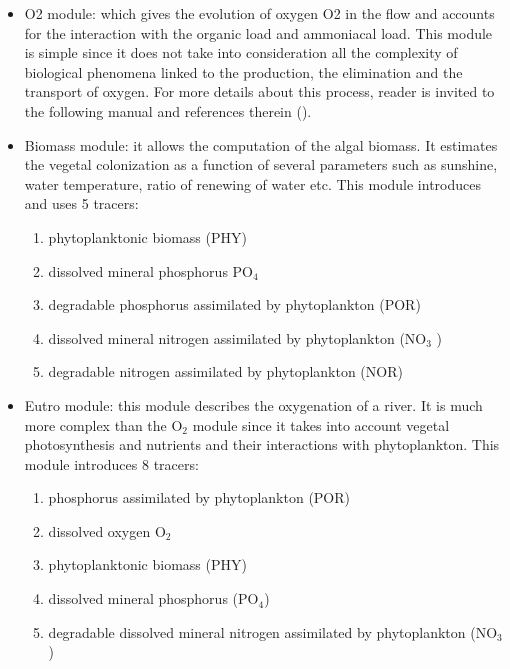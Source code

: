 \begin{itemize}
\item  O2 module:  which gives the evolution of oxygen O2 in the flow and accounts for the interaction with the organic load and ammoniacal load. This module is simple since it does not take into consideration all the complexity of biological phenomena linked to the production, the elimination and the transport of oxygen. For more details about this process, reader is invited to the following manual and references therein (\cite{El-Kadi2012}).

\item  Biomass module:  it allows the computation of the algal biomass. It estimates the vegetal colonization as a function of several parameters such as sunshine, water temperature, ratio of renewing of water etc. This module introduces and uses 5 tracers:

\begin{enumerate}
\item  phytoplanktonic biomass (PHY)

\item  dissolved mineral phosphorus PO${}_{4}$

\item  degradable phosphorus assimilated by phytoplankton (POR)

\item  dissolved mineral nitrogen assimilated by phytoplankton (NO${}_{3}$ )

\item  degradable nitrogen assimilated by phytoplankton (NOR)
\end{enumerate}

\item  Eutro module:  this module describes the oxygenation of a river. It is much more complex than the O${}_{2}$ module since it takes into account vegetal photosynthesis and nutrients and their interactions with phytoplankton. This module introduces 8 tracers:
\begin{enumerate}
\item  phosphorus assimilated by phytoplankton (POR)

\item  dissolved oxygen O${}_{2}$

\item  phytoplanktonic biomass (PHY)

\item  dissolved mineral phosphorus (PO${}_{4}$)

\item  degradable dissolved mineral nitrogen assimilated by phytoplankton (NO${}_{3}$)


\end{enumerate}
\end{itemize}
